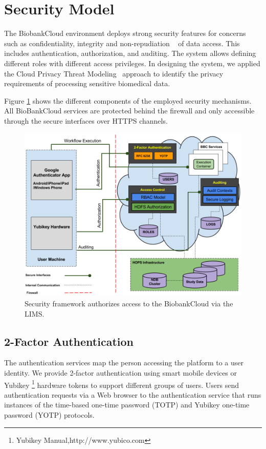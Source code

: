\section{Security Model}

The BiobankCloud environment deploys strong security features for concerns such as confidentiality, integrity and non-repudiation ~\cite{BBCSEC} of data access. This includes authentication, authorization, and auditing. The system allows defining different roles with different access privileges. In designing the system, we applied the Cloud Privacy Threat Modeling~\cite {CPTM} approach to identify the privacy requirements of processing sensitive biomedical data.


Figure \ref{fig:security} shows the different components of the employed security mechanisms. All BioBankCloud services are protected behind the firewall and only accessible through the secure interfaces over HTTPS channels.


\begin{figure}[h]
\centering
\includegraphics[width=\textwidth]{./imgs/security.png}
\caption{Security framework authorizes access to the BiobankCloud via the LIMS.}
\label{fig:security}
\end{figure}

\vspace{-5mm}

\subsection{2-Factor Authentication}
The authentication services map the person accessing the platform to a user identity. We provide 2-factor authentication using smart mobile devices or Yubikey \footnote {Yubikey Manual,http://www.yubico.com} hardware tokens to support different groups of users. Users send authentication requests via a Web browser to the authentication service that runs instances of the time-based one-time password (TOTP) and Yubikey one-time password (YOTP) protocols.

